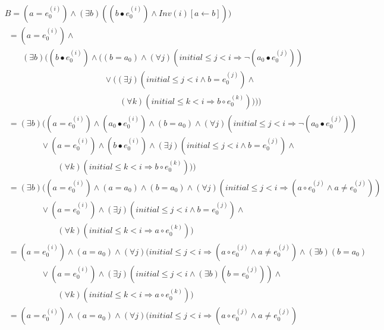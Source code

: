 \documentclass[a4paper,10pt]{article}
\newcommand{\idx}{\ensuremath{i}\xspace}
\newcommand{\idxinitial}{\ensuremath{\mathit{initial}}\xspace}
\newcommand{\at}[1]{{(#1)}}
\newcommand{\impl}{\ensuremath{\Longrightarrow}}
\newcommand{\Inv}[1]{\ensuremath{\mathit{Inv}(#1)\xspace}}
\newenvironment{proof}[1][Proof.]{\begin{trivlist}
\item[\hskip \labelsep {\bfseries #1}]}{\end{trivlist}}
\begin{document}
\begin{proof}
\begin{align*}
  \end{align*}
  \begin{align*}
    &B= (a = e_0^\at{\idx}) \land (\exists b) ((b \bullet e_0^\at{\idx}) \land \Inv{\idx}[a\leftarrow b])) \\
    &~~= (a = e_0^\at{\idx}) \land \\
    &\phantom{B=} 
       (\exists b) ((b \bullet e_0^\at{\idx}) \land ((b = a_0) \land (\forall j)(\idxinitial \leq j < \idx \impl \neg (a_0 \bullet e_0^\at{j})) \\
    &\phantom{B= (a = e_0^\at{\idx}) \land (\exists b) (} 
       \lor ((\exists j)(\idxinitial \leq j < \idx \land b = e_0^\at{j}) \land \\
    &\phantom{B= (a = e_0^\at{\idx}) \land ((b \bullet e_0\at{\idx}} 
       (\forall k)(\idxinitial \leq k < \idx \impl b \circ e_0^\at{k})))) \\
    &~~= (\exists b) ((a = e_0^\at{\idx}) \land (a_0 \bullet e_0^\at{\idx}) \land (b = a_0) \land (\forall j)(\idxinitial \leq j < \idx \impl \neg (a_0 \bullet e_0^\at{j})) \\
    &\phantom{B= (a =} 
       \lor (a = e_0^\at{\idx}) \land  (b \bullet e_0^\at{\idx}) \land (\exists j)(\idxinitial \leq j < \idx \land b = e_0^\at{j}) \land \\
    &\phantom{B= (a = e_0^\at{\idx}} 
       (\forall k)(\idxinitial \leq k < \idx \impl b \circ e_0^\at{k}))) \\
    &~~= (\exists b) ((a = e_0^\at{\idx}) \land (a =a_0) \land (b = a_0) \land (\forall j)(\idxinitial \leq j < \idx \impl (a \circ e_0^\at{j} \land a \neq e_0^\at{j})) \\
    &\phantom{B= (a =} 
       \lor (a = e_0^\at{\idx}) \land (\exists j)(\idxinitial \leq j < \idx \land b = e_0^\at{j}) \land \\
    &\phantom{B= (a = e_0^\at{\idx}} 
       (\forall k)(\idxinitial \leq k < \idx \impl a \circ e_0^\at{k})) \\
    &~~= (a = e_0^\at{\idx}) \land (a =a_0) \land  (\forall j)(\idxinitial \leq j < \idx \impl (a \circ e_0^\at{j} \land a \neq e_0^\at{j}) \land (\exists b) (b = a_0) \\
    &\phantom{B= (a =} 
       \lor (a = e_0^\at{\idx}) \land (\exists j)(\idxinitial \leq j < \idx \land (\exists b) (b = e_0^\at{j})) \land \\
    &\phantom{B= (a = e_0^\at{\idx}} 
       (\forall k)(\idxinitial \leq k < \idx \impl a \circ e_0^\at{k})) \\
    &~~= (a = e_0^\at{\idx}) \land (a =a_0) \land (\forall j)(\idxinitial \leq j < \idx \impl (a \circ e_0^\at{j} \land a \neq e_0^\at{j}) \\

\end{align*}
\end{proof}
\end{document}
